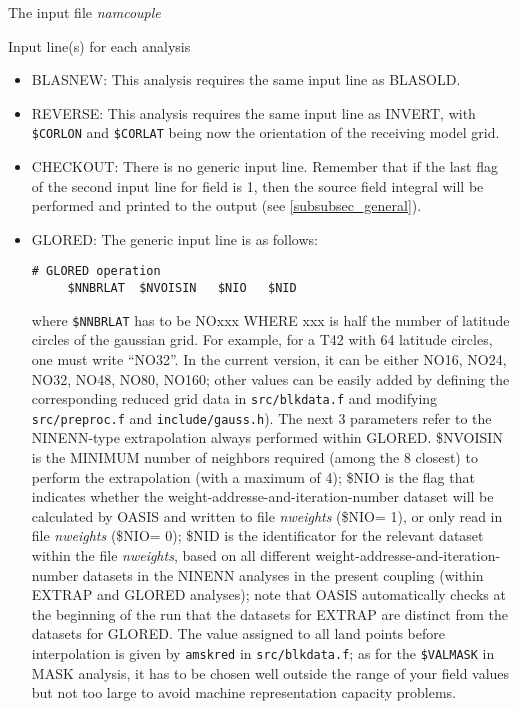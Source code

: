 \begin{subsection}{The input file {\it namcouple}}
\begin{subsubsection}{Input line(s) for each analysis}
\begin{itemize}
\begin{enumerate}
\end{enumerate}
\item BLASNEW: This analysis requires the same input line as BLASOLD.

\item REVERSE: This analysis requires the same input line as INVERT,
with {\tt \$CORLON} and {\tt \$CORLAT} being now the orientation of the
receiving model grid.

\item CHECKOUT: There is no generic input line. Remember that if the
last flag of the second input line for field is 1, then the source field
integral will be performed and printed to the output (see 
\ref{subsubsec_general}).

\item GLORED: The generic input line is as follows:
\begin{verbatim}
# GLORED operation
     $NNBRLAT  $NVOISIN   $NIO   $NID
\end{verbatim} 
where {\tt \$NNBRLAT} has to be NOxxx WHERE xxx is half the number of 
latitude circles of the gaussian grid. For example, for a T42 with 64 
latitude circles, one must write ``NO32''. In the current
version, it can be either NO16, NO24, NO32, NO48, NO80, NO160; other
values can be easily added by defining the corresponding reduced grid data in
{\tt src/blkdata.f} and modifying {\tt src/preproc.f} and 
{\tt include/gauss.h}). The next 3
parameters refer to the NINENN-type extrapolation always performed
within GLORED. \$NVOISIN is the MINIMUM number of neighbors required
(among the 8 closest) to perform the extrapolation (with a maximum of
4); \$NIO is the flag that indicates whether the 
weight-addresse-and-iteration-number dataset will be calculated by
OASIS and written to file {\em nweights} (\$NIO= 1), or only read in file
{\em nweights} (\$NIO= 0); \$NID is the identificator for the relevant dataset
 within the file {\em nweights}, based on all different 
weight-addresse-and-iteration-number datasets in the NINENN analyses
in the present coupling (within EXTRAP and GLORED analyses); note
that OASIS automatically checks at the beginning of the run that the
datasets for EXTRAP are distinct from the datasets for GLORED. The
value assigned to all land points before interpolation is given
by {\tt amskred} in {\tt src/blkdata.f}; as for the {\tt \$VALMASK}
in MASK analysis, it has to be chosen well outside the range of your
field values but not too large to avoid machine representation
capacity problems. 
\end{itemize}

\end{subsubsection}

\end{subsection}